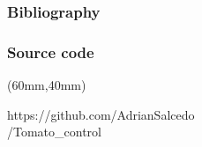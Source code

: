 \begin{frame}[plain]\frametitle{Bibliography}
	\begin{bibunit}[abbrv]
		\nocite{Bokil2019optimal}
		\putbib
	\end{bibunit}

	\begin{bibunit}[abbrv]
		\nocite{Grandits2019}
		\putbib
	\end{bibunit}

	\begin{bibunit}[abbrv]
		\nocite{yong1999stochastic}
		\putbib
	\end{bibunit}

\end{frame}
\begin{frame}[plain]\frametitle{Source code}
	\begin{textblock*}{60mm}(60mm,40mm)
		\begin{yellowbox}{}
			https://github.com/AdrianSalcedo\\/Tomato\_control
		\end{yellowbox}
	\end{textblock*}
\end{frame}
